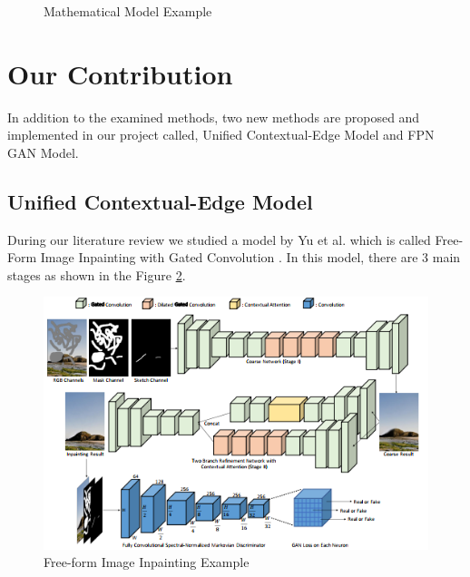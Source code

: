 \begin{figure}[!ht]
        \hspace{0.02\columnwidth}
        \vspace*{3mm}
        \caption{Mathematical Model Example}
    \label{fig:mathmodel}
\end{figure}

\section{Our Contribution}

In addition to the examined methods, two new methods are proposed and implemented in our project called, Unified Contextual-Edge Model and FPN GAN Model.

\subsection{Unified Contextual-Edge Model}
During our literature review we studied a model by Yu et al. which is called Free-Form Image Inpainting with Gated Convolution \cite{freeform_inpainting}. In this model, there are 3 main stages as shown in the Figure \ref{fig:freeform}.

\begin{figure}[h!]
    \centering
    \includegraphics[scale=0.7]{figures/chapter5/Free-form.PNG}
    \vspace*{3mm}
    \caption{Free-form Image Inpainting Example \cite{freeform_inpainting}}
    \label{fig:freeform}
\end{figure}

